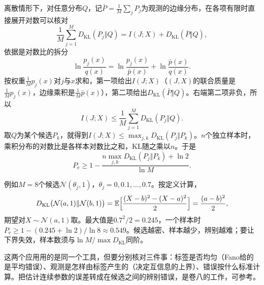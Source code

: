 离散情形下，对任意分布$Q$，记$\bar{P}=\tfrac1M\sum_jP_j$为观测的边缘分布，在各项有限时直接展开对数可以核对
\[
  \frac1M\sum_{j=1}^{M}D_{\mathrm{KL}}(P_j\Vert Q)=I(J;X)+D_{\mathrm{KL}}(\bar{P}\Vert Q),
\]
依据是对数比的拆分
\[
  \ln\frac{p_j(x)}{q(x)}=\ln\frac{p_j(x)}{\bar{p}(x)}+\ln\frac{\bar{p}(x)}{q(x)}.
\]
按权重$\tfrac1Mp_j(x)$对$j$与$x$求和，第一项给出$I(J;X)$（$(J,X)$的联合质量是$\tfrac1Mp_j(x)$，边缘乘积是$\tfrac1M\bar{p}(x)$），第二项给出$D_{\mathrm{KL}}(\bar{P}\Vert Q)$。右端第二项非负，所以
\[
  I(J;X)\leq\frac1M\sum_{j=1}^{M}D_{\mathrm{KL}}(P_j\Vert Q).
\]
取$Q$为某个候选$P_k$，就得到$I(J;X)\leq\max_{j,k}D_{\mathrm{KL}}(P_j\Vert P_k)$。$n$个独立样本时，乘积分布的对数比是各样本对数比之和，KL随之乘以$n$。于是
\[
  P_{\mathrm{e}}\geq1-\frac{n\max_{j,k}D_{\mathrm{KL}}(P_j\Vert P_k)+\ln2}{\ln M}.
\]

例如$M=8$个候选$\mathcal{N}(\theta_j,1)$，$\theta_j=0,0.1,\dots,0.7$。按定义计算，
\[
  D_{\mathrm{KL}}\bigl(\mathcal{N}(a,1)\Vert\mathcal{N}(b,1)\bigr)=\mathbb{E}\Bigl[\frac{(X-b)^{2}-(X-a)^{2}}{2}\Bigr]=\frac{(a-b)^{2}}{2},
\]
期望对$X\sim\mathcal{N}(a,1)$取。最大值是$0.7^{2}/2=0.245$，一个样本时$P_{\mathrm{e}}\geq1-(0.245+\ln2)/\ln8\approx0.549$。候选越密、样本越少，辨别越难；要让下界失效，样本数须与$\ln M/\max D_{\mathrm{KL}}$同阶。

这两个应用用的是同一个工具，但要分别核对三件事：标签是否均匀（Fano给的是平均错误）、观测是怎样由标签产生的（决定互信息的上界）、错误按什么标准计算。把估计连续参数的误差转成在候选之间的辨别错误，是卷八的工作，可参考。
